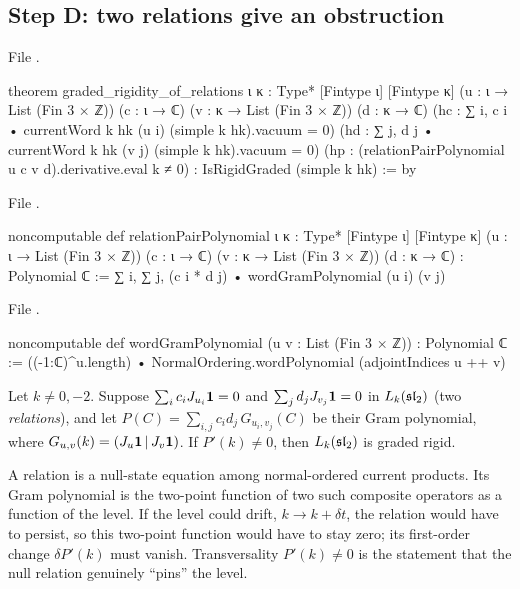 \subsection{Step D: two relations give an obstruction}

\noindent File .
\begin{leancode}
theorem graded_rigidity_of_relations {ι κ : Type*} [Fintype ι] [Fintype κ]
    (u : ι → List (Fin 3 × ℤ)) (c : ι → ℂ)
    (v : κ → List (Fin 3 × ℤ)) (d : κ → ℂ)
    (hc : ∑ i, c i • currentWord k hk (u i) (simple k hk).vacuum = 0)
    (hd : ∑ j, d j • currentWord k hk (v j) (simple k hk).vacuum = 0)
    (hp : (relationPairPolynomial u c v d).derivative.eval k ≠ 0) :
    IsRigidGraded (simple k hk) := by
\end{leancode}
\noindent File .
\begin{leancode}
noncomputable def relationPairPolynomial {ι κ : Type*} [Fintype ι] [Fintype κ]
    (u : ι → List (Fin 3 × ℤ)) (c : ι → ℂ)
    (v : κ → List (Fin 3 × ℤ)) (d : κ → ℂ) : Polynomial ℂ :=
  ∑ i, ∑ j, (c i * d j) • wordGramPolynomial (u i) (v j)
\end{leancode}
\noindent File .
\begin{leancode}
noncomputable def wordGramPolynomial (u v : List (Fin 3 × ℤ)) : Polynomial ℂ :=
  ((-1:ℂ)^u.length) • NormalOrdering.wordPolynomial (adjointIndices u ++ v)
\end{leancode}

\begin{theorem}\label{l09:thm:relations}
Let $k\ne0,-2$. Suppose $\sum_i c_i J_{u_i}\mathbf{1} = 0$ and $\sum_j d_jJ_{v_j}\mathbf{1} = 0$ in $L_k(\mathfrak{sl}_2)$
(two \emph{relations}), and let $P(C) = \sum_{i,j}c_id_j\,G_{u_i,v_j}(C)$ be their Gram polynomial, where
$G_{u,v}(k) = (J_u\mathbf{1}\,|\,J_v\mathbf{1})$. If $P'(k)\neq0$, then $L_k(\mathfrak{sl}_2)$ is graded rigid.
\end{theorem}
\begin{physics}
A relation is a null-state equation among normal-ordered current products. Its Gram polynomial is the
two-point function of two such composite operators as a function of the level. If the level could drift,
$k\to k+\delta t$, the relation would have to persist, so this two-point function would have to stay zero;
its first-order change $\delta P'(k)$ must vanish. Transversality $P'(k)\neq0$ is the statement that the
null relation genuinely ``pins'' the level.
\end{physics}



